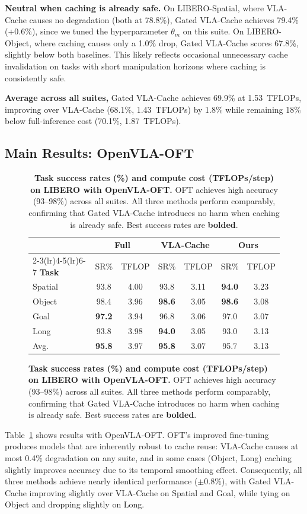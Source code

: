 \documentclass[letterpaper, 10 pt, conference]{ieeeconf}  %
\newcommand{\ourmethod}{Gated VLA-Cache}
\begin{document}
\textbf{Neutral when caching is already safe.}
On LIBERO-Spatial, where VLA-Cache causes no degradation (both at
78.8\%), \ourmethod{} achieves 79.4\% (+0.6\%), since we tuned the hyperparameter $\theta_m$ on this suite.
On LIBERO-Object, where caching causes only a 1.0\% drop, \ourmethod{}
scores 67.8\%, slightly below both baselines.
This likely reflects occasional unnecessary cache invalidation on
tasks with short manipulation horizons where caching is consistently
safe.

\textbf{Average across all suites,}
\ourmethod{} achieves 69.9\% at 1.53~TFLOPs, improving over VLA-Cache
(68.1\%, 1.43~TFLOPs) by 1.8\% while remaining 18\% below full-inference
cost (70.1\%, 1.87~TFLOPs).

\subsection{Main Results: OpenVLA-OFT}
\begin{figure}[t]
\begin{table}[H]
  \centering
  \caption{%
    \textbf{Task success rates (\%) and compute cost (TFLOPs/step) on
    LIBERO with OpenVLA-OFT.}
    OFT achieves high accuracy (93--98\%) across all suites.
    All three methods perform comparably, confirming that \ourmethod{}
    introduces no harm when caching is already safe.
    Best success rates are \textbf{bolded}.
  }
  \label{tab:main_oft}
  \small
  \begin{tabular}{l cc cc cc}
    \toprule
    & \multicolumn{2}{c}{\textbf{Full}} &
      \multicolumn{2}{c}{\textbf{VLA-Cache}} &
      \multicolumn{2}{c}{\textbf{Ours}} \\
    \cmidrule(lr){2-3}\cmidrule(lr){4-5}\cmidrule(lr){6-7}
    \textbf{Task} & SR\% & TFLOP & SR\% & TFLOP & SR\% & TFLOP \\
    \midrule
    Spatial & 93.8 & 4.00 & 93.8 & 3.11 & \textbf{94.0} & 3.23 \\
    Object  & 98.4 & 3.96 & \textbf{98.6} & 3.05 & \textbf{98.6} & 3.08 \\
    Goal    & \textbf{97.2} & 3.94 & 96.8 & 3.06 & 97.0 & 3.07 \\
    Long      & 93.8 & 3.98 & \textbf{94.0} & 3.05 & 93.0 & 3.13 \\
    \midrule
    Avg.    & \textbf{95.8} & 3.97 & \textbf{95.8} & 3.07 & 95.7 & 3.13 \\
    \bottomrule
  \end{tabular}
  \vspace{-0.5em}
\end{table}
\end{figure}
Table~\ref{tab:main_oft} shows results with OpenVLA-OFT.
OFT's improved fine-tuning produces models that are inherently robust to
cache reuse: VLA-Cache causes at most 0.4\% degradation on any suite,
and in some cases (Object, Long) caching slightly improves accuracy
due to its temporal smoothing effect.
Consequently, all three methods achieve nearly identical performance
($\pm$0.8\%), with \ourmethod{} improving slightly over VLA-Cache on
Spatial and Goal, while tying on Object and dropping slightly on Long.
\end{document}

